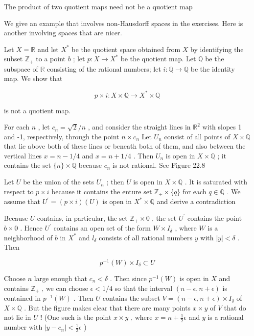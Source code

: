 \begin{example} The product of two quotient maps need not be a quotient map

We give an example that involves non-Hausdorff spaces in the exercises. Here is another involving spaces that are nicer.

Let \(X = \mathbb{R}\) and let \({X}^{ * }\) be the quotient space obtained from \(X\) by identifying the subset \({\mathbb{Z}}_{ + }\) to a point \(b\) ; let \(p : X \rightarrow  {X}^{ * }\) be the quotient map. Let \(\mathbb{Q}\) be the subspace of \(\mathbb{R}\) consisting of the rational numbers; let \(i : \mathbb{Q} \rightarrow  \mathbb{Q}\) be the identity map. We show that

\[
p \times  i : X \times  \mathbb{Q} \rightarrow  {X}^{ * } \times  \mathbb{Q}
\]

is not a quotient map.

For each \(n\) , let \({c}_{n} = \sqrt{2}/n\) , and consider the straight lines in \({\mathbb{R}}^{2}\) with slopes 1 and -1, respectively, through the point \(n \times  {c}_{n}\) Let \({U}_{n}\) consist of all points of \(X \times  \mathbb{Q}\) that lie above both of these lines or beneath both of them, and also between the vertical lines \(x = n - 1/4\) and \(x = n + 1/4\) . Then \({U}_{n}\) is open in \(X \times  \mathbb{Q}\) ; it contains the set \(\{ n\}  \times  \mathbb{Q}\) because \({c}_{n}\) is not rational. See Figure 22.8

Let \(U\) be the union of the sets \({U}_{n}\) ; then \(U\) is open in \(X \times  \mathbb{Q}\) . It is saturated with respect to \(p \times  i\) because it contains the enture set \({\mathbb{Z}}_{ + } \times  \{ q\}\) for each \(q \in  \mathbb{Q}\) . We assume that \({U}^{\prime } = \left( {p \times  i}\right) \left( U\right)\) is open in \({X}^{ * } \times  \mathbb{Q}\) and derive a contradiction

Because \(U\) contains, in particular, the set \({\mathbb{Z}}_{ + } \times  0\) , the set \({U}^{\prime }\) contains the point \(b \times  0\) . Hence \({U}^{\prime }\) contains an open set of the form \(W \times  {I}_{\delta }\) , where \(W\) is a neighborhood of \(b\) in \({X}^{ * }\) and \({l}_{\delta }\) consists of all rational numbers \(y\) with \(\left| y\right|  < \delta\) . Then

\[
{p}^{-1}\left( W\right)  \times  {I}_{\delta } \subset  U
\]

Choose \(n\) large enough that \({c}_{n} < \delta\) . Then since \({p}^{-1}\left( W\right)\) is open in \(X\) and contains \({\mathbb{Z}}_{ + }\) , we can choose \(\epsilon  < 1/4\) so that the interval \(\left( {n - \epsilon ,n + \epsilon }\right)\) is contained in \({p}^{-1}\left( W\right)\) . Then \(U\) contains the subset \(V = \left( {n - \epsilon ,n + \epsilon }\right)  \times  {I}_{\delta }\) of \(X \times  \mathbb{Q}\) . But the figure makes clear that there are many points \(x \times  y\) of \(V\) that do not lie in \(U\) ! (One such is the point \(x \times  y\) , where \(x = n + \frac{1}{2}\epsilon\) and \(y\) is a rational number with \(\left| {y - {c}_{n}}\right|  < \frac{1}{2}\epsilon\) )


\end{example}
